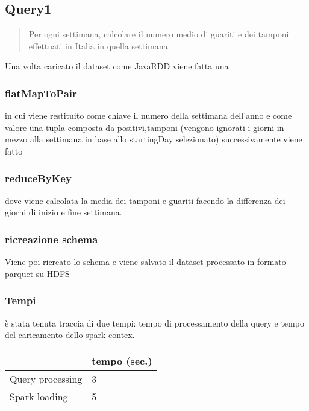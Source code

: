 \documentclass[acmsmall]{acmart}
\begin{document}
\subsection{Query1}
\begin{quote}
Per ogni settimana, calcolare il numero medio di guariti e dei tamponi effettuati in Italia in quella
settimana.\end{quote}

Una volta caricato il dataset come JavaRDD viene fatta una 

\subsubsection{flatMapToPair} 
in cui viene restituito 
come chiave il numero della settimana dell'anno e come valore una tupla composta da positivi,tamponi (vengono ignorati i giorni in mezzo alla settimana in base allo startingDay selezionato) successivamente viene fatto

\subsubsection{reduceByKey}
dove viene calcolata la media dei tamponi e guariti facendo la differenza dei giorni di inizio e fine settimana.
\subsubsection{ricreazione schema}
Viene poi ricreato lo schema e viene salvato il dataset processato in formato parquet su HDFS

\subsubsection{Tempi}
è stata tenuta traccia di due tempi: tempo di processamento della query e tempo del caricamento dello spark contex.

\hspace{40mm} \begin{tabular}{l|l|}
\cline{2-2}
                                       & tempo (sec.) \\ \hline
\multicolumn{1}{|l|}{Query processing} & 3            \\ \hline
\multicolumn{1}{|l|}{Spark loading}    & 5            \\ \hline
\end{tabular}
\end{document}
